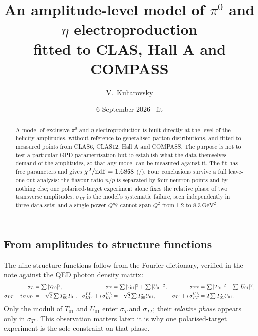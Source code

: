 \documentclass[11pt,a4paper]{article}
\title{An amplitude-level model of $\pi^0$ and $\eta$ electroproduction\\
       fitted to CLAS, Hall A and COMPASS}
\author{V.\ Kubarovsky}
\date{6 September 2026 \quad--\quad fit \texttt{\fittag}}
\newcommand{\sig}[1]{\sigma_{#1}}
\begin{document}
\maketitle

\begin{abstract}
\noindent
A model of exclusive $\pi^0$ and $\eta$ electroproduction is built directly at
the level of the helicity amplitudes, without reference to generalised parton
distributions, and fitted to \nfit{} measured points from CLAS6, CLAS12,
Hall A and COMPASS.  The purpose is not to test a particular GPD
parametrisation but to establish what the data themselves demand of the
amplitudes, so that any model can be measured against it.  The fit has \npar{}
free parameters and gives $\chi^2/\mathrm{ndf} = 1.6868$ (\chitot/\ndf).
Four conclusions survive a full leave-one-out analysis: the flavour ratio
$n/p$ is separated by four neutron points and by nothing else; one
polarised-target
experiment alone fixes the relative phase of two transverse amplitudes;
$\sig{LT}$ is the model's systematic failure, seen independently in three data
sets; and a single power $Q^{n_Q}$ cannot span $Q^2$ from $1.2$ to
$8.3\ \mathrm{GeV}^2$.
\end{abstract}



\subsection{From amplitudes to structure functions}

The nine structure functions follow from the Fourier dictionary, verified in
the note against the QED photon density matrix:
\begin{align}
\sig{L} &= \textstyle\sum |T_{00}|^2, &
\sig{T} &= \textstyle\sum |T_{01}|^2 + \sum |U_{01}|^2, &
\sig{TT} &= \textstyle\sum |T_{01}|^2 - \sum |U_{01}|^2,\notag\\
\sig{LT} + i\,\sig{LT'} &= -\sqrt2 \textstyle\sum T_{00}^{*} T_{01}, &
\sig{LT'}^{LL} + i\,\sig{LT}^{UL} &= -\sqrt2 \textstyle\sum T_{00}^{*} U_{01}, &
\sig{T'} + i\,\sig{TT}^{UL} &= 2 \textstyle\sum T_{01}^{*} U_{01}.
\label{eq:gram}
\end{align}
Only the moduli of $T_{01}$ and $U_{01}$ enter $\sig{T}$ and $\sig{TT}$; their
\emph{relative phase} appears only in $\sig{T'}$.  This observation matters
later: it is why one polarised-target experiment is the sole constraint on that
phase.
\end{document}
